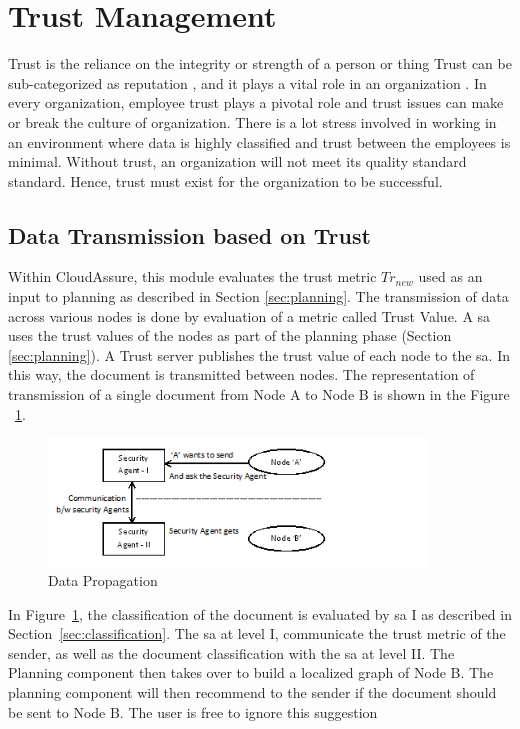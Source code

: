 \section{Trust Management}
\label{sec:trust-management}
Trust is the reliance on the integrity or strength of a person or thing
\autocite{Dictionary2013} Trust can be sub-categorized as reputation
, and it plays a vital role in an organization \autocite{Liu2006}. In every organization, employee trust plays
a pivotal role and trust issues can make or break the culture of organization. There is a
lot stress involved in working in an environment where data is highly classified and trust
between the employees is minimal. Without trust, an organization will not meet its
quality standard standard. Hence, trust must exist for the organization to be successful.

\subsection{Data Transmission based on Trust}
Within CloudAssure, this module evaluates the trust metric \( Tr_{new} \) used
as an input to planning as described in Section \ref{sec:planning}. The transmission of data across various
nodes is done by evaluation of a metric called Trust Value. A \gls{sa} 
uses the trust values of the nodes as part of the planning phase (Section
\ref{sec:planning}). A Trust server publishes the trust value of each node to
the \gls{sa}. In this way, the document is transmitted between
nodes. The representation of transmission of a single document from Node A to Node B is
shown in the Figure ~\ref{fig:DataTransmission}.
\begin{figure}[h!]
    \begin{center}
        \includegraphics[width=0.90\textwidth]{Figures/figure1.png}
        \caption{Data Propagation}
        \label{fig:DataTransmission}
    \end{center}
\end{figure}


In Figure~\ref{fig:DataTransmission}, the classification of the document
is evaluated by \gls{sa} I as described in Section~\ref{sec:classification}. 
The \gls{sa} at level I, communicate the trust metric of the sender, as well as
the document classification with the \gls{sa} at level II. The Planning
component then takes over to build a localized graph of Node B. The planning
component will then recommend to the sender if the document should be sent to
Node B. The user is free to ignore this suggestion

